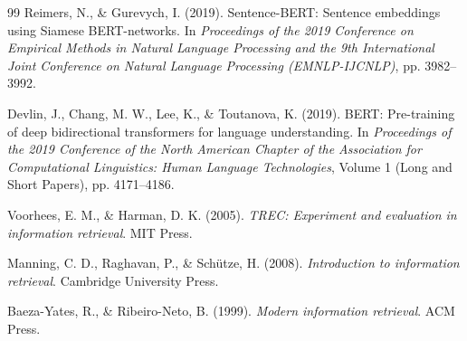 \documentclass[12pt,a4paper]{report}
\begin{document}
\begin{thebibliography}{99}
Reimers, N., \& Gurevych, I. (2019). Sentence-BERT: Sentence embeddings using Siamese BERT-networks. In \textit{Proceedings of the 2019 Conference on Empirical Methods in Natural Language Processing and the 9th International Joint Conference on Natural Language Processing (EMNLP-IJCNLP)}, pp. 3982--3992.

Devlin, J., Chang, M. W., Lee, K., \& Toutanova, K. (2019). BERT: Pre-training of deep bidirectional transformers for language understanding. In \textit{Proceedings of the 2019 Conference of the North American Chapter of the Association for Computational Linguistics: Human Language Technologies}, Volume 1 (Long and Short Papers), pp. 4171--4186.

Voorhees, E. M., \& Harman, D. K. (2005). \textit{TREC: Experiment and evaluation in information retrieval}. MIT Press.

Manning, C. D., Raghavan, P., \& Sch\"utze, H. (2008). \textit{Introduction to information retrieval}. Cambridge University Press.

Baeza-Yates, R., \& Ribeiro-Neto, B. (1999). \textit{Modern information retrieval}. ACM Press.

\end{thebibliography}
\end{document}
